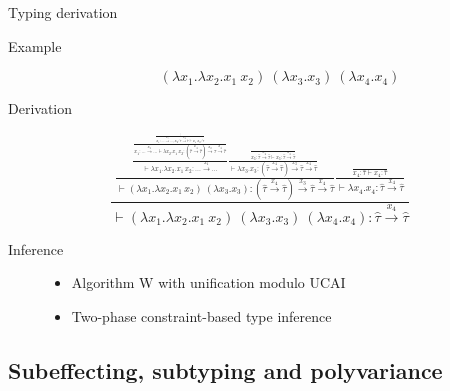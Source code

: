 \documentclass{beamer}
\newcommand{\Abs}[2]{\lambda #1.#2}
\newcommand{\App}[2]{#1\ #2}
\newcommand{\AFun}[3]{#1 \xrightarrow{#2} #3}
\newcommand{\Judge}[3][\Gamma]{#1 \vdash #2 : #3}
\newcommand{\tauhat}{\widehat\tau}
\begin{document}
\begin{frame}{Typing derivation}
	\begin{description}
		\item[Example]
			\[\left(\Abs{x_1}{\Abs{x_2}{\App{x_1}{x_2}}}\right)\ \left(\Abs{x_3}{x_3}\right)\ \left(\Abs{x_4}{x_4}\right) \]
		\item[Derivation]
	\end{description}
	\vspace{1em}
	\begin{equation*}
		\frac{\frac{\frac{\frac{\frac{\vdots}
		                             {\Judge[x_1 : \AFun{...}{x_3}{...}, x_2 : \AFun{\tauhat}{x_4}{\tauhat}]{\App{x_1}{x_2}}{\tauhat}}}
		                       {\Judge[x_1 : \AFun{...}{x_3}{...}]{\Abs{x_2}{\App{x_1}{x_2}}}{\AFun{\left(\AFun{\tauhat}{x_4}{\tauhat}\right)}{x_2}{\AFun{\tauhat}{x_4}{\tauhat}}}}}
		                 {\Judge[]{\Abs{x_1}{\Abs{x_2}{\App{x_1}{x_2}}}}{\AFun{...}{x_1}{...}}}
		            \frac{\frac{}{\Judge[x_3 : \AFun{\tauhat}{x_4}{\tauhat}]{x_3}{\AFun{\tauhat}{x_4}{\tauhat}}}}
		                 {\Judge[]{\Abs{x_3}{x_3}}{\AFun{\left(\AFun{\tauhat}{x_4}{\tauhat}\right)}{x_3}{\AFun{\tauhat}{x_4}{\tauhat}}}}}
		           {\Judge[]{\left(\Abs{x_1}{\Abs{x_2}{\App{x_1}{x_2}}}\right)\ \left(\Abs{x_3}{x_3}\right)}{\AFun{\left(\AFun{\tauhat}{x_4}{\tauhat}\right)}{x_3}{\AFun{\tauhat}{x_4}{\tauhat}}}}
		      \frac{\frac{}{\Judge[x_4 : \tauhat]{x_4}{\tauhat}}}
		                 {\Judge[]{\Abs{x_4}{x_4}}{\AFun{\tauhat}{x_4}{\tauhat}}}}
		     {\Judge[]{\left(\Abs{x_1}{\Abs{x_2}{\App{x_1}{x_2}}}\right)\ \left(\Abs{x_3}{x_3}\right)\ \left(\Abs{x_4}{x_4}\right)}{\AFun{\tauhat}{x_4}{\tauhat}}}
	\end{equation*}
	\vspace*{0.1em}
	\begin{description}
		\item[Inference] \begin{itemize}
			\item Algorithm W with unification modulo UCAI
			\item Two-phase constraint-based type inference
		\end{itemize}
	\end{description}
\end{frame}

\subsection{Subeffecting, subtyping and polyvariance}
\end{document}
